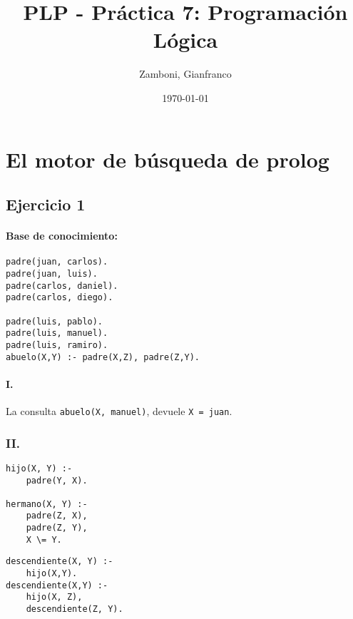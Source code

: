 \documentclass[10pt,a4paper]{article}
\begin{document}
  \title{PLP - Práctica 7: Programación Lógica}

  \date{\today}

  \author{Zamboni, Gianfranco}

  \maketitle
  \setcounter{page}{1}


\section*{El motor de búsqueda de prolog}

\subsection{Ejercicio 1}
\paragraph{Base de conocimiento:}
\begin{centrado}
\begin{verbatim}
padre(juan, carlos).
padre(juan, luis).
padre(carlos, daniel).
padre(carlos, diego).

padre(luis, pablo).
padre(luis, manuel).
padre(luis, ramiro).
abuelo(X,Y) :- padre(X,Z), padre(Z,Y).
\end{verbatim}
\end{centrado}

\paragraph{I.} La consulta \texttt{abuelo(X, manuel)}, devuele \texttt{X = juan}.

\subsubsection*{II.}
\begin{multicols}{2}
\begin{centrado2}
\begin{verbatim}
hijo(X, Y) :-
	padre(Y, X).

hermano(X, Y) :-
	padre(Z, X), 
	padre(Z, Y),
	X \= Y.
\end{verbatim}
\end{centrado2}
\vfill\null
\columnbreak
\begin{centrado2}
\begin{verbatim}
descendiente(X, Y) :-
	hijo(X,Y).
descendiente(X,Y) :-
	hijo(X, Z),
	descendiente(Z, Y).
\end{verbatim}
\end{centrado2}
\end{multicols}
\end{document}

